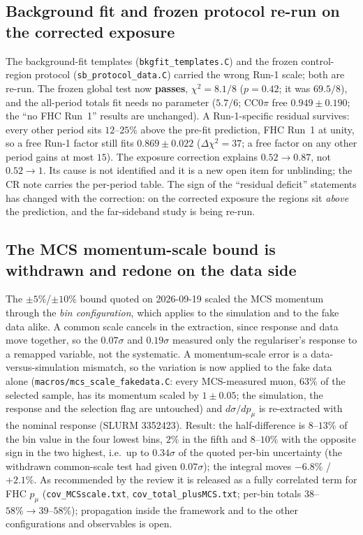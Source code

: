 \subsection{Background fit and frozen protocol re-run on the corrected exposure}
The background-fit templates (\texttt{bkgfit\_templates.C}) and the frozen control-region protocol
(\texttt{sb\_protocol\_data.C}) carried the wrong Run-1 scale; both are re-run. The frozen global test
now \textbf{passes}, $\chi^2=8.1/8$ ($p=0.42$; it was $69.5/8$), and the all-period totals fit needs no
parameter ($5.7/6$; CC$0\pi$ free $0.949\pm0.190$; the ``no FHC Run~1'' results are unchanged). A
Run-1-specific residual survives: every other period sits $12$--$25\%$ above the pre-fit prediction,
FHC Run~1 at unity, so a free Run-1 factor still fits $0.869\pm0.022$ ($\Delta\chi^2=37$; a free
factor on any other period gains at most $15$). The exposure correction explains $0.52\to0.87$, not
$0.52\to1$. Its cause is not identified and it is a new open item for unblinding; the CR note carries
the per-period table. The sign of the ``residual deficit'' statements has changed with the
correction: on the corrected exposure the regions sit \emph{above} the prediction, and the
far-sideband study is being re-run.

\subsection{The MCS momentum-scale bound is withdrawn and redone on the data side}
The $\pm5\%$/$\pm10\%$ bound quoted on 2026-09-19 scaled the MCS momentum through the
\emph{bin configuration}, which applies to the simulation and to the fake data alike. A common
scale cancels in the extraction, since response and data move together, so the $0.07\sigma$ and
$0.19\sigma$ measured only the regulariser's response to a remapped variable, not the systematic.
A momentum-scale error is a data-versus-simulation mismatch, so the variation is now applied to
the fake data alone (\texttt{macros/mcs\_scale\_fakedata.C}: every MCS-measured muon, $63\%$ of the
selected sample, has its momentum scaled by $1\pm0.05$; the simulation, the response and the
selection flag are untouched) and $d\sigma/dp_\mu$ is re-extracted with the nominal response
(SLURM 3352423). Result: the half-difference is $8$--$13\%$ of the bin value in the four lowest bins,
$2\%$ in the fifth and $8$--$10\%$ with the opposite sign in the two highest, i.e.\ up to $0.34\sigma$
of the quoted per-bin uncertainty (the withdrawn common-scale test had given $0.07\sigma$); the integral
moves $-6.8\%$ / $+2.1\%$. As recommended by the review it is released as a fully correlated term
for FHC $p_\mu$ (\texttt{cov\_MCSscale.txt}, \texttt{cov\_total\_plusMCS.txt}; per-bin totals
$38$--$58\%\to39$--$58\%$); propagation inside the framework and to the other configurations and
observables is open.

